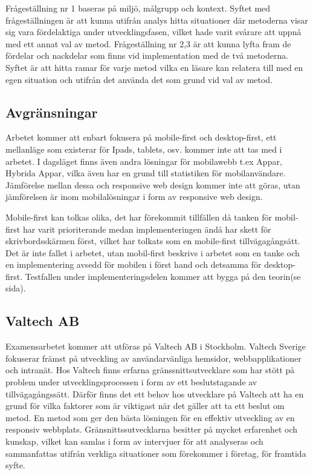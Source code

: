 \documentclass[11pt]{article}
\begin{document}
Frågeställning nr 1 baseras på miljö, målgrupp och kontext. Syftet med frågeställningen är att kunna utifrån analys hitta situationer där metoderna visar sig vara fördelaktiga under utvecklingsfasen, vilket hade varit svårare att uppnå med ett annat val av metod. Frågeställning nr 2,3 är att kunna lyfta fram de fördelar och nackdelar som finns vid implementation med de två metoderna. Syftet är att hitta ramar för varje metod vilka en läsare kan relatera till med en egen situation och utifrån det använda det som grund vid val av metod. 

\subsection{Avgränsningar}

Arbetet kommer att enbart fokusera på mobile-first och desktop-first, ett mellanläge som existerar för Ipads, tablets, osv. kommer inte att tas med i arbetet. I dagsläget finns även andra lösningar för mobilawebb t.ex Appar, Hybrida Appar, vilka även har en grund till statistiken för mobilanvändare. Jämförelse mellan dessa och responsive web design kommer inte att göras, utan jämförelsen är inom mobilalösningar i form av responsive web design.

Mobile-first kan tolkas olika, det har förekommit tillfällen då tanken för mobil-first har varit prioriterande medan implementeringen ändå har skett för skrivbordsskärmen först, vilket har tolkats som en mobile-first tillvägagångsätt.  Det är inte fallet i arbetet, utan mobil-first beskrivs i arbetet som en tanke och en implementering avsedd för mobilen i först hand och detsamma för desktop-first. Testfallen under implementeringsdelen kommer att bygga på den teorin(se sida).

\newpage

\subsection{Valtech AB}
Examensarbetet kommer att utföras på Valtech AB i Stockholm. Valtech Sverige fokuserar främst på utveckling av användarvänliga hemsidor, webbapplikationer och intranät. Hos Valtech finns erfarna gränssnittsutvecklare som har stött på problem under utvecklingsprocessen i form av ett beslutstagande av tillvägagångssätt. Därför finns det ett behov hos utvecklare på Valtech att ha en grund för vilka faktorer som är viktigast när det gäller att ta ett beslut om metod. En metod som ger den bästa lösningen för en effektiv utveckling av en responsiv webbplats. Gränsnittssutvecklarna besitter på mycket erfarenhet och kunskap, vilket kan samlas i form av intervjuer för att analyseras och sammanfattas utifrån verkliga situationer som förekommer i företag, för framtida syfte.
\end{document}

